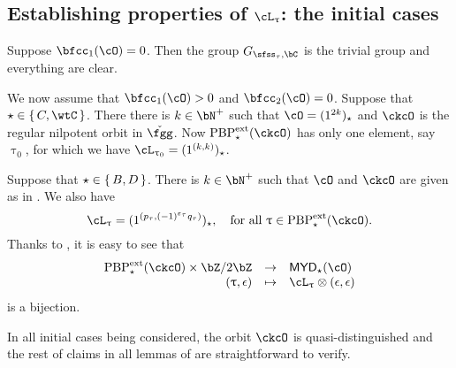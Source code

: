 \documentclass[12pt,a4paper]{amsart}
\def\MYD{{\mathsf{MYD}}}
\numberwithin{equation}{section}
\theoremstyle{remark}
\def\PBPes{\mathrm{PBP}^{\mathrm{ext}}_{\star}}
\begin{document}
\subsection{Establishing properties of $\ac_{\uptau}$: the initial cases}
\label{sec:init}
Suppose $\bfcc_{1}(\cO)=0$.
Then the group $G_{\sfss_\tau,\bC}$ is the trivial group and everything are
clear.

\smallskip

We now assume that $\bfcc_{1}(\cO)>0$ and $\bfcc_{2}(\cO)=0$. Suppose that
$\star \in \set{C,\wtC}$. 
There there is $k\in\bN^{+}$ such that $\cO =
(1^{2k})_{\star}$ and $\ckcO$ is the regular nilpotent orbit in $\ckfgg$.
Now $\PBPes(\ckcO)$ has only one element, say $\uptau_{0}$, for which
we have $\ac_{\uptau_{0}} = (1^{(k,k)})_{\star}$.

\smallskip

Suppose that $\star \in \set{B,D}$. 
There is $k\in \bN^{+}$ such that
$\cO$ and $\ckcO$ are given as in .
We also have
\[
  \ac_{\uptau} = (1^{(p_{\tau},(-1)^{\varepsilon_{\tau}}q_{\tau})})_{\star},
  \quad  \Forall \uptau\in \PBPes(\ckcO).
\]
Thanks to , it is easy to see that
\[
  \begin{array}{rcl}
    \PBPes(\ckcO)\times \bZ/2\bZ & \rightarrow & \MYD_{\star}(\cO)\\
    (\uptau,\epsilon) & \mapsto & \ac_{\uptau}\otimes (\epsilon,\epsilon)
  \end{array}
\]
is a bijection.



\smallskip

In all initial cases being considered, the orbit $\ckcO$ is quasi-distinguished and the rest of claims in all lemmas
of  are straightforward to verify.
\end{document}
